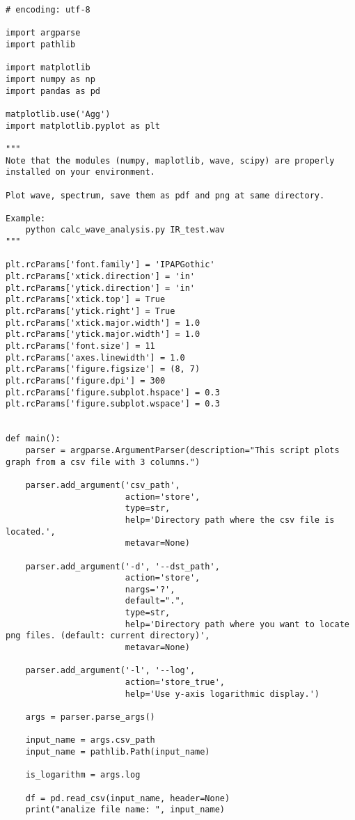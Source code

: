 \begin{lstlisting}[caption=plot\_from\_csv.py,label=plot\_from\_csv.py]
# encoding: utf-8

import argparse
import pathlib

import matplotlib
import numpy as np
import pandas as pd

matplotlib.use('Agg')
import matplotlib.pyplot as plt

"""
Note that the modules (numpy, maplotlib, wave, scipy) are properly installed on your environment.

Plot wave, spectrum, save them as pdf and png at same directory.

Example:
    python calc_wave_analysis.py IR_test.wav
"""

plt.rcParams['font.family'] = 'IPAPGothic'
plt.rcParams['xtick.direction'] = 'in'
plt.rcParams['ytick.direction'] = 'in'
plt.rcParams['xtick.top'] = True
plt.rcParams['ytick.right'] = True
plt.rcParams['xtick.major.width'] = 1.0
plt.rcParams['ytick.major.width'] = 1.0
plt.rcParams['font.size'] = 11
plt.rcParams['axes.linewidth'] = 1.0
plt.rcParams['figure.figsize'] = (8, 7)
plt.rcParams['figure.dpi'] = 300
plt.rcParams['figure.subplot.hspace'] = 0.3
plt.rcParams['figure.subplot.wspace'] = 0.3


def main():
    parser = argparse.ArgumentParser(description="This script plots graph from a csv file with 3 columns.")

    parser.add_argument('csv_path',
                        action='store',
                        type=str,
                        help='Directory path where the csv file is located.',
                        metavar=None)

    parser.add_argument('-d', '--dst_path',
                        action='store',
                        nargs='?',
                        default=".",
                        type=str,
                        help='Directory path where you want to locate png files. (default: current directory)',
                        metavar=None)

    parser.add_argument('-l', '--log',
                        action='store_true',
                        help='Use y-axis logarithmic display.')

    args = parser.parse_args()

    input_name = args.csv_path
    input_name = pathlib.Path(input_name)

    is_logarithm = args.log

    df = pd.read_csv(input_name, header=None)
    print("analize file name: ", input_name)


\end{lstlisting}

